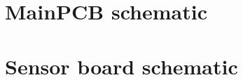 \documentclass[11pt,a4paper]{article}
\begin{document}
\section{MainPCB schematic}\label{app:mainpcb_schematic}


\newpage

\section{Sensor board schematic}\label{app:sensorboard_schematic}

\newpage
\end{document}
